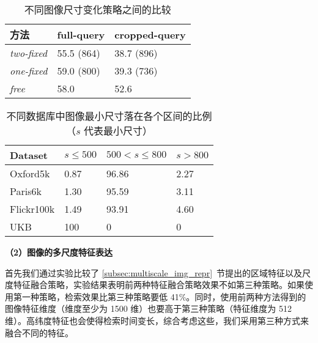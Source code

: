 \begin{table}[!t]
	\centering
	\caption{不同图像尺寸变化策略之间的比较}
	\label{table:image_size_impact}
	\begin{tabular}{lll}
		\toprule
		方法		    & full-query			& cropped-query \\
		\midrule
		\emph{two-fixed}		&		55.5 (864)		& 	38.7 (896)	\\
		\emph{one-fixed}		&		59.0 (800) 		&	39.3 (736)\\
		\emph{free}				&		58.0	 		&	52.6 	\\
		\bottomrule
	\end{tabular}
\end{table}

\begin{table}[!t]
	\centering
	\caption{不同数据库中图像最小尺寸落在各个区间的比例（$s$ 代表最小尺寸）}
	\label{table:min_size_distribution}
	\begin{tabular}{llll}
		\toprule
		Dataset & $s\leq 500$ & $500<s\leq 800$&  $s>800$ \\
		\midrule
		Oxford5k & 0.87 & 96.86 & 2.27 \\
		Paris6k & 1.30  & 95.59 & 3.11 \\
		Flickr100k & 1.49 & 93.91 & 4.60\\
		UKB & 100 & 0 & 0 \\
		\bottomrule
	\end{tabular}
	\end{table}

\noindent\textbf{（2）图像的多尺度特征表达}

首先我们通过实验比较了 \ref{subsec:multiscale_img_repr}~节提出的区域特征以及尺度特征融合策略，实验结果表明前两种特征融合策略效果不如第三种策略。如果使用第一种策略，检索效果比第三种策略要低 41\%。同时，使用前两种方法得到的图像特征维度（维度至少为 1500 维）也要高于第三种策略（特征维度为 512 维）。高纬度特征也会使得检索时间变长，综合考虑这些，我们采用第三种方式来融合不同的特征。

